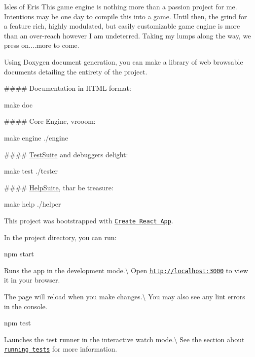 Isles of Eris This game engine is nothing more than a passion project for me. Intentions may be one day to compile this into a game. Until then, the grind for a feature rich, highly modulated, but easily customizable game engine is more than an over-\/reach however I am undeterred. Taking my lumps along the way, we press on....more to come.

Using Doxygen document generation, you can make a library of web browsable documents detailing the entirety of the project.

\#\#\#\# Documentation in H\+T\+ML format\+: 
\begin{DoxyCode}
make doc
\end{DoxyCode}


\#\#\#\# Core Engine, vrooom\+: 
\begin{DoxyCode}
make engine
./engine
\end{DoxyCode}


\#\#\#\# \mbox{\hyperlink{classTestSuite}{Test\+Suite}} and debuggers delight\+: 
\begin{DoxyCode}
make test
./tester
\end{DoxyCode}


\#\#\#\# \mbox{\hyperlink{classHelpSuite}{Help\+Suite}}, thar be treasure\+: 
\begin{DoxyCode}
make help
./helper
\end{DoxyCode}


This project was bootstrapped with \href{https://github.com/facebook/create-react-app}{\tt Create React App}.

In the project directory, you can run\+:


\begin{DoxyCode}
npm start
\end{DoxyCode}


Runs the app in the development mode.\textbackslash{} Open \href{http://localhost:3000}{\tt http\+://localhost\+:3000} to view it in your browser.

The page will reload when you make changes.\textbackslash{} You may also see any lint errors in the console.


\begin{DoxyCode}
npm test
\end{DoxyCode}


Launches the test runner in the interactive watch mode.\textbackslash{} See the section about \href{https://facebook.github.io/create-react-app/docs/running-tests}{\tt running tests} for more information.



